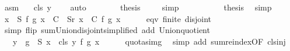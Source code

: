 \begin{isabellebody}
\ asm\ \isamarkupfalse%
\ {\isacharasterisk}{\kern0pt}{\isacharcolon}{\kern0pt}\ {\isachardoublequoteopen}{\isacharquery}{\kern0pt}cls\ y\ {\isacharequal}{\kern0pt}\ {\isacharbraceleft}{\kern0pt}{\isacharbraceright}{\kern0pt}{\isachardoublequoteclose}\ \isamarkupfalse%
\ auto\isanewline
\ \ \ \ \ \ \isamarkupfalse%
\ {\isacharquery}{\kern0pt}thesis\ \isamarkupfalse%
\ {\isacharasterisk}{\kern0pt}\ \isamarkupfalse%
\ simp\isanewline
\ \ \ \ \isamarkupfalse%
\isanewline
\ \ \ \ \isamarkupfalse%
\ {\isacharquery}{\kern0pt}thesis\ \isamarkupfalse%
\ simp\isanewline
\ \ \isamarkupfalse%
\isanewline
\isanewline
\ \ \isamarkupfalse%
\ {\isachardoublequoteopen}{\isacharparenleft}{\kern0pt}{\isasymSum}x\ {\isasymin}\ S{\isachardot}{\kern0pt}\ f\ {\isacharparenleft}{\kern0pt}g\ x{\isacharparenright}{\kern0pt}{\isacharparenright}{\kern0pt}\ {\isacharequal}{\kern0pt}\ {\isacharparenleft}{\kern0pt}{\isasymSum}C\ {\isasymin}\ S{\isacharslash}{\kern0pt}{\isacharslash}{\kern0pt}{\isacharquery}{\kern0pt}r{\isachardot}{\kern0pt}\ {\isasymSum}x\ {\isasymin}\ C{\isachardot}{\kern0pt}\ f\ {\isacharparenleft}{\kern0pt}g\ x{\isacharparenright}{\kern0pt}{\isacharparenright}{\kern0pt}{\isachardoublequoteclose}\isanewline
\ \ \ \ \isamarkupfalse%
\ eqv\ finite\ disjoint\isanewline
\ \ \ \ \isamarkupfalse%
\ {\isacharparenleft}{\kern0pt}simp\ flip{\isacharcolon}{\kern0pt}\ sum{\isachardot}{\kern0pt}Union{\isacharunderscore}{\kern0pt}disjoint{\isacharbrackleft}{\kern0pt}simplified{\isacharbrackright}{\kern0pt}\ add{\isacharcolon}{\kern0pt}\ Union{\isacharunderscore}{\kern0pt}quotient{\isacharparenright}{\kern0pt}\isanewline
\ \ \isamarkupfalse%
\ \isamarkupfalse%
\ {\isachardoublequoteopen}{\isachardot}{\kern0pt}{\isachardot}{\kern0pt}{\isachardot}{\kern0pt}\ {\isacharequal}{\kern0pt}\ {\isacharparenleft}{\kern0pt}{\isasymSum}y\ {\isasymin}\ g\ {\isacharbackquote}{\kern0pt}\ S{\isachardot}{\kern0pt}\ {\isasymSum}x\ {\isasymin}\ {\isacharquery}{\kern0pt}cls\ y{\isachardot}{\kern0pt}\ f\ {\isacharparenleft}{\kern0pt}g\ x{\isacharparenright}{\kern0pt}{\isacharparenright}{\kern0pt}{\isachardoublequoteclose}\isanewline
\ \ \ \ \isamarkupfalse%
\ quot{\isacharunderscore}{\kern0pt}as{\isacharunderscore}{\kern0pt}img\ \isamarkupfalse%
\ {\isacharparenleft}{\kern0pt}simp\ add{\isacharcolon}{\kern0pt}\ sum{\isachardot}{\kern0pt}reindex{\isacharbrackleft}{\kern0pt}OF\ cls{\isacharunderscore}{\kern0pt}inj{\isacharbrackright}{\kern0pt}{\isacharparenright}{\kern0pt}\isanewline

\end{isabellebody}
